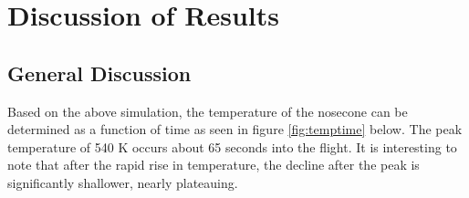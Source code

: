 \documentclass[twocolumn]{article}
\begin{document}
    \section{Discussion of Results}

        \subsection{General Discussion}
            Based on the above simulation, the temperature of the nosecone can
            be determined as a function of time as seen in figure 
            \ref{fig:temptime} below. The peak temperature of 540 K occurs
            about 65 seconds into the flight. It is interesting to note that 
            after the rapid rise in temperature, the decline after the peak is 
            significantly shallower, nearly plateauing. 
            
\end{document}
